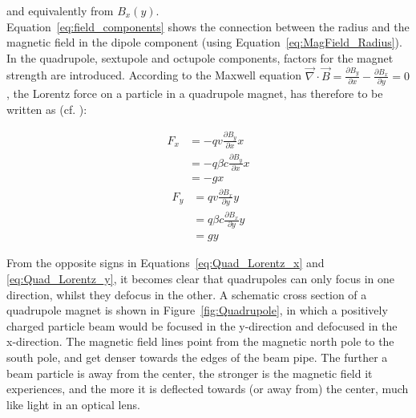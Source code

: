 and equivalently from $B_x(y)$.
\\Equation~\ref{eq:field_components} shows the connection between the radius and the magnetic field in the dipole component (using Equation~\ref{eq:MagField_Radius}).
In the quadrupole, sextupole and octupole components, factors for the magnet strength are introduced.
According to the Maxwell equation $\vec{\nabla}\cdot\vec{B} = \frac{\partial B_y}{\partial x} -\frac{\partial B_x}{\partial y} = 0$, the Lorentz force on a particle in a quadrupole magnet, has therefore to be written as (cf. \cite[p. 372]{VacuumElectronics}):
\begin{multicols}{2}
\noindent 
\begin{align}
 F_x &= -qv\frac{\partial B_y}{\partial x}x \nonumber\\
  &= -q\beta c\frac{\partial B_y}{\partial x}x\\
  &= -gx\label{eq:Quad_Lorentz_x}
\end{align}
\columnbreak
\begin{align}
 F_y &= qv\frac{\partial B_x}{\partial y}y\nonumber \\
  &= q\beta c\frac{\partial B_x}{\partial y}y\\
  &= gy \label{eq:Quad_Lorentz_y}
\end{align}
\end{multicols}
From the opposite signs in Equations~\ref{eq:Quad_Lorentz_x} and \ref{eq:Quad_Lorentz_y}, it becomes clear that quadrupoles can only focus in one direction, whilst they defocus in the other.
A schematic cross section of a quadrupole magnet is shown in Figure~\ref{fig:Quadrupole}, in which a positively charged particle beam would be focused in the y-direction and defocused in the x-direction. 
The magnetic field lines point from the magnetic north pole to the south pole, and get denser towards the edges of the beam pipe.
The further a beam particle is away from the center, the stronger is the magnetic field it experiences, and the more it is deflected towards (or away from) the center, much like light in an optical lens.
